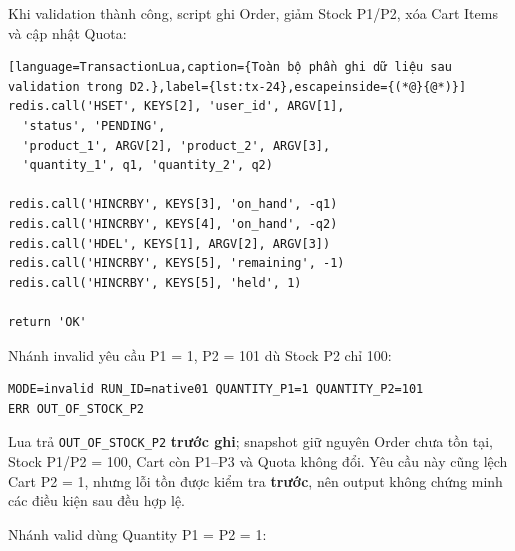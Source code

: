 Khi validation thành công, script ghi Order, giảm Stock P1/P2, xóa Cart Items và cập nhật Quota:

\begin{lstlisting}[language=TransactionLua,caption={Toàn bộ phần ghi dữ liệu sau validation trong D2.},label={lst:tx-24},escapeinside={(*@}{@*)}]
redis.call('HSET', KEYS[2], 'user_id', ARGV[1],
  'status', 'PENDING',
  'product_1', ARGV[2], 'product_2', ARGV[3],
  'quantity_1', q1, 'quantity_2', q2)

redis.call('HINCRBY', KEYS[3], 'on_hand', -q1)
redis.call('HINCRBY', KEYS[4], 'on_hand', -q2)
redis.call('HDEL', KEYS[1], ARGV[2], ARGV[3])
redis.call('HINCRBY', KEYS[5], 'remaining', -1)
redis.call('HINCRBY', KEYS[5], 'held', 1)

return 'OK'
\end{lstlisting}

Nhánh invalid yêu cầu P1 = 1, P2 = 101 dù Stock P2 chỉ 100:

\begingroup
{}\label{result:tx-18}
\nopagebreak[4]
\begin{Verbatim}
MODE=invalid RUN_ID=native01 QUANTITY_P1=1 QUANTITY_P2=101
ERR OUT_OF_STOCK_P2
\end{Verbatim}
\endgroup\par\smallskip
Lua trả \texttt{OUT\_\allowbreak{}OF\_\allowbreak{}STOCK\_\allowbreak{}P2} \textbf{trước ghi}; snapshot giữ nguyên Order chưa tồn tại, Stock P1/P2 = 100, Cart còn P1–P3 và Quota không đổi. Yêu cầu này cũng lệch Cart P2 = 1, nhưng lỗi tồn được kiểm tra \textbf{trước}, nên output không chứng minh các điều kiện sau đều hợp lệ.

Nhánh valid dùng Quantity P1 = P2 = 1:

